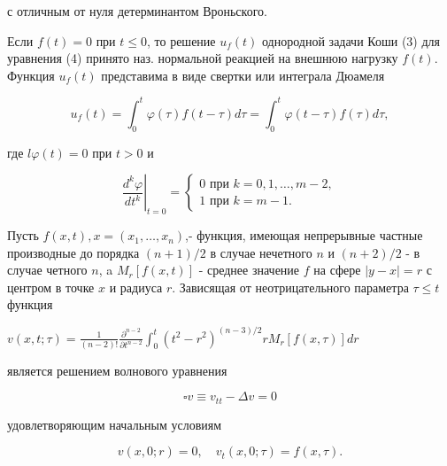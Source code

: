\documentclass[10pt]{article}
\begin{document}
с отличным от нуля детерминантом Вроньского.



Если $f(t)=0$ при $t \leqslant 0$, то решение $u_{f}(t)$ однородной задачи Коши (3) для уравнения (4) принято наз. нормальной реакцией на внешнюю нагрузку $f(t)$. Функция $u_{f}(t)$ представима в виде свертки или интеграла Дюамеля



\[

u_{f}(t)=\int_{0}^{t} \varphi(\tau) f(t-\tau) d \tau=\int_{0}^{t} \varphi(t-\tau) f(\tau) d \tau,

\]



где $l \varphi(t)=0$ при $t>0$ и



\[

\left.\frac{d^{k} \varphi}{d t^{k}}\right|_{t=0}=\left\{\begin{array}{l}

0 \text { при } k=0,1, \ldots, m-2, \\

1 \text { при } k=m-1 .

\end{array}\right.

\]



Пусть $f(x, t), x=\left(x_{1}, \ldots, x_{n}\right)$,- функция, имеющая непрерывные частные производные до порядка $(n+1) / 2$ в случае нечетного $n$ и $(n+2) / 2$ - в случае четного $n$, a $M_{r}[f(x, t)]$ - среднее значение $f$ на сфере $|y-x|=r$ с центром в точке $x$ и радиуса $r$. Зависящая от неотрицательного параметра $\tau \leqslant t$ функция



$v(x, t ; \tau)=\frac{1}{(n-2) !} \frac{\partial^{n-2}}{\partial t^{n-2}} \int_{0}^{t}\left(t^{2}-r^{2}\right)^{(n-3) / 2} r M_{r}[f(x, \tau)] d r$



является решением волнового уравнения



\[

\square v \equiv v_{t t}-\Delta v=0

\]



удовлетворяющим начальным условиям



\[

v(x, 0 ; r)=0, \quad v_{t}(x, 0 ; \tau)=f(x, \tau) .

\]
\end{document}
